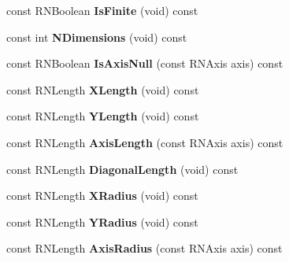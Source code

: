 \begin{DoxyCompactItemize}
\item 
const R\+N\+Boolean {\bfseries Is\+Finite} (void) const \hypertarget{class_r2_box_a62d577bdf9766fbe8b48d81b080a385f}{}\label{class_r2_box_a62d577bdf9766fbe8b48d81b080a385f}

\item 
const int {\bfseries N\+Dimensions} (void) const \hypertarget{class_r2_box_af1b950d7ad219912f013888099c3f1e1}{}\label{class_r2_box_af1b950d7ad219912f013888099c3f1e1}

\item 
const R\+N\+Boolean {\bfseries Is\+Axis\+Null} (const R\+N\+Axis axis) const \hypertarget{class_r2_box_a7a7fb7e1e1ec7a4054d6977e0ab7bd24}{}\label{class_r2_box_a7a7fb7e1e1ec7a4054d6977e0ab7bd24}

\item 
const R\+N\+Length {\bfseries X\+Length} (void) const \hypertarget{class_r2_box_a7799dee779e65e05d8706268fdd781b9}{}\label{class_r2_box_a7799dee779e65e05d8706268fdd781b9}

\item 
const R\+N\+Length {\bfseries Y\+Length} (void) const \hypertarget{class_r2_box_a2a11fc13e01af6e3406e786c6fac2a80}{}\label{class_r2_box_a2a11fc13e01af6e3406e786c6fac2a80}

\item 
const R\+N\+Length {\bfseries Axis\+Length} (const R\+N\+Axis axis) const \hypertarget{class_r2_box_a1c6d4035f6233b3e28d4c58ca1c116fd}{}\label{class_r2_box_a1c6d4035f6233b3e28d4c58ca1c116fd}

\item 
const R\+N\+Length {\bfseries Diagonal\+Length} (void) const \hypertarget{class_r2_box_a3710743c6019ae501cb21cfc112c8d12}{}\label{class_r2_box_a3710743c6019ae501cb21cfc112c8d12}

\item 
const R\+N\+Length {\bfseries X\+Radius} (void) const \hypertarget{class_r2_box_a2d169bc15a9522100f7f408714d342b8}{}\label{class_r2_box_a2d169bc15a9522100f7f408714d342b8}

\item 
const R\+N\+Length {\bfseries Y\+Radius} (void) const \hypertarget{class_r2_box_a9a0f3b70398d507cd44d31b0d01cb135}{}\label{class_r2_box_a9a0f3b70398d507cd44d31b0d01cb135}

\item 
const R\+N\+Length {\bfseries Axis\+Radius} (const R\+N\+Axis axis) const \hypertarget{class_r2_box_a61766b6503d244fa1121985c04126b45}{}\label{class_r2_box_a61766b6503d244fa1121985c04126b45}


\end{DoxyCompactItemize}
